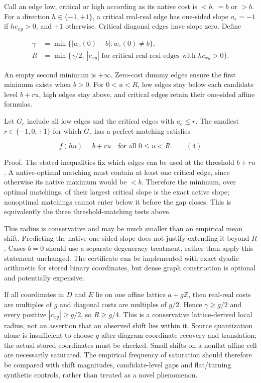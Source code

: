 \documentclass[
  11pt,
]{article}
\begin{document}
Call an edge low, critical or high according as its native cost is
\(<b\), \(=b\) or \(>b\). For a direction \(h\in \{-1,+1\}\), a critical
real-real edge has one-sided slope \(a_e=-1\) if \(h c_{xy}>0\), and
\(+1\) otherwise. Critical diagonal edges have slope zero. Define

\[
\begin{aligned}\gamma&=\min\{|w_e(0)-b|:w_e(0)\ne b\},\\ R&=\min\{\gamma/2,\ |c_{xy}|\text{ for critical real-real edges with }h c_{xy}>0\}.\end{aligned}
\]

An empty second minimum is \(+\infty\). Zero-cost dummy edges ensure the
first minimum exists when \(b>0\). For \(0<u<R\), low edges stay below
each candidate level \(b+ru\), high edges stay above, and critical edges
retain their one-sided affine formulas.

Let \(G_r\) include all low edges and the critical edges with
\(a_e\leq r\). The smallest \(r\in \{-1,0,+1\}\) for which \(G_r\) has a
perfect matching satisfies

\[
f(hu)=b+ru\quad\text{for all }0\leq u<R.\qquad (4)
\]

Proof. The stated inequalities fix which edges can be used at the
threshold \(b+ru\). A native-optimal matching must contain at least one
critical edge, since otherwise its native maximum would be \(<b\).
Therefore the minimum, over optimal matchings, of their largest critical
slope is the exact active slope; nonoptimal matchings cannot enter below
it before the gap closes. This is equivalently the three
threshold-matching tests above.

This radius is conservative and may be much smaller than an empirical
mean shift. Predicting the native one-sided slope does not justify
extending it beyond \(R\). Cases \(b=0\) should use a separate
degeneracy treatment, rather than apply this statement unchanged. The
certificate can be implemented with exact dyadic arithmetic for stored
binary coordinates, but dense graph construction is optional and
potentially expensive.

If all coordinates in \(D\) and \(E\) lie on one affine lattice
\(a+g\mathbb Z\), then real-real costs are multiples of \(g\) and
diagonal costs are multiples of \(g/2\). Hence \(\gamma\geq g/2\) and
every positive \(|c_{xy}|\geq g/2\), so \(R\geq g/4\). This is a
conservative lattice-derived local radius, not an assertion that an
observed shift lies within it. Source quantization alone is insufficient
to choose \(g\) after diagram-coordinate recovery and translation; the
actual stored coordinates must be checked. Small shifts on a nonflat
affine cell are necessarily saturated. The empirical frequency of
saturation should therefore be compared with shift magnitudes,
candidate-level gaps and flat/turning synthetic controls, rather than
treated as a novel phenomenon.
\end{document}
